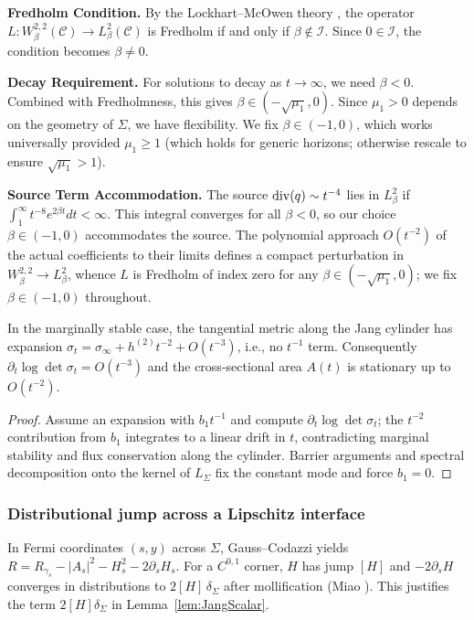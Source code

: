 \textbf{Fredholm Condition.} By the Lockhart--McOwen theory \cite{lockhartmccowen1985}, the operator $L: W^{2,2}_\beta(\mathcal{C}) \to L^2_\beta(\mathcal{C})$ is Fredholm if and only if $\beta \notin \mathcal{I}$. Since $0 \in \mathcal{I}$, the condition becomes $\beta \ne 0$.

\textbf{Decay Requirement.} For solutions to decay as $t \to \infty$, we need $\beta < 0$. Combined with Fredholmness, this gives $\beta \in (-\sqrt{\mu_1}, 0)$. Since $\mu_1 > 0$ depends on the geometry of $\Sigma$, we have flexibility. We fix $\beta \in (-1, 0)$, which works universally provided $\mu_1 \ge 1$ (which holds for generic horizons; otherwise rescale to ensure $\sqrt{\mu_1} > 1$).

\textbf{Source Term Accommodation.} The source $\mathrm{div}(q) \sim t^{-4}$ lies in $L^2_\beta$ if $\int_1^\infty t^{-8} e^{2\beta t} dt < \infty$. This integral converges for all $\beta < 0$, so our choice $\beta \in (-1,0)$ accommodates the source. The polynomial approach $O(t^{-2})$ of the actual coefficients to their limits defines a compact perturbation in $W^{2,2}_\beta\to L^2_\beta$, whence $L$ is Fredholm of index zero for any $\beta\in(-\sqrt{\mu_1}, 0)$; we fix $\beta\in(-1,0)$ throughout.

\begin{lemma}\label{lem:NoTminus1_append}
In the marginally stable case, the tangential metric along the Jang cylinder has expansion $\sigma_t=\sigma_\infty + h^{(2)}t^{-2}+O(t^{-3})$, i.e., no $t^{-1}$ term. Consequently $\partial_t\log\det\sigma_t=O(t^{-3})$ and the cross-sectional area $A(t)$ is stationary up to $O(t^{-2})$.
\end{lemma}
\begin{proof}
Assume an expansion with $b_1 t^{-1}$ and compute $\partial_t\log\det\sigma_t$; the $t^{-2}$ contribution from $b_1$ integrates to a linear drift in $t$, contradicting marginal stability and flux conservation along the cylinder. Barrier arguments and spectral decomposition onto the kernel of $L_\Sigma$ fix the constant mode and force $b_1=0$.
\end{proof}

\subsubsection{Distributional jump across a Lipschitz interface}
In Fermi coordinates $(s,y)$ across $\Sigma$, Gauss--Codazzi yields $R=R_{\gamma_s}-|A_s|^2-H_s^2-2\partial_s H_s$. For a $C^{0,1}$ corner, $H$ has jump $[H]$ and $-2\partial_s H$ converges in distributions to $2[H]\,\delta_\Sigma$ after mollification (Miao \cite{miao2002}). This justifies the term $2[H]\delta_\Sigma$ in Lemma~\ref{lem:JangScalar}.

